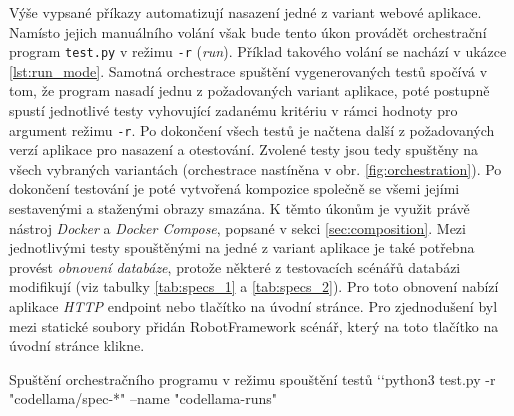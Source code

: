\documentclass[czech, ma, kiv, he, iso690numb, pdf, viewonly]{fasthesis}
\begin{document}
    Výše vypsané příkazy automatizují nasazení jedné z variant webové aplikace. Namísto jejich manuálního volání však bude tento úkon provádět orchestrační program \verb|test.py| v režimu \verb|-r| (\textit{run}). Příklad takového volání se nachází v ukázce \ref{lst:run_mode}. Samotná orchestrace spuštění vygenerovaných testů spočívá v tom, že program nasadí jednu z požadovaných variant aplikace, poté postupně spustí jednotlivé testy vyhovující zadanému kritériu v rámci hodnoty pro argument režimu \verb|-r|. Po dokončení všech testů je načtena další z požadovaných verzí aplikace pro nasazení a otestování. Zvolené testy jsou tedy spuštěny na všech vybraných variantách (orchestrace nastíněna v obr. \ref{fig:orchestration}). Po dokončení testování je poté vytvořená kompozice společně se všemi jejími sestavenými a staženými obrazy smazána. K těmto úkonům je využit právě nástroj \textit{Docker} a \textit{Docker Compose}, popsané v sekci \ref{sec:composition}. Mezi jednotlivými testy spouštěnými na jedné z variant aplikace je také potřebna provést \textit{obnovení databáze}, protože některé z testovacích scénářů databázi modifikují (viz tabulky \ref{tab:specs_1} a \ref{tab:specs_2}). Pro toto obnovení nabízí aplikace \textit{HTTP} endpoint nebo tlačítko na úvodní stránce. Pro zjednodušení byl mezi statické soubory přidán RobotFramework scénář, který na toto tlačítko na úvodní stránce klikne.

    \begin{console}{Spuštění orchestračního programu v režimu spouštění testů \label{lst:run_mode}}
`\uxprompt`python3 test.py -r "codellama/spec-*" --name "codellama-runs"
    \end{console}
\end{document}
